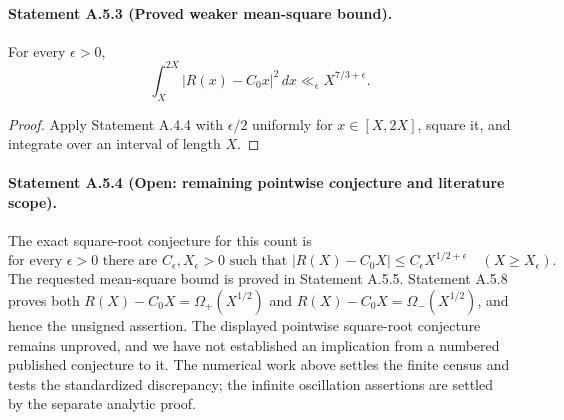 \paragraph{Statement A.5.3 (Proved weaker mean-square bound).}
For every $\epsilon>0$,
\[
 \int_X^{2X}|R(x)-C_0x|^2\,dx\ll_\epsilon X^{7/3+\epsilon}.
\]
\begin{proof}
Apply Statement A.4.4 with $\epsilon/2$ uniformly for
$x\in[X,2X]$, square it, and integrate over an interval of length $X$.
\end{proof}

\paragraph{Statement A.5.4 (Open: remaining pointwise conjecture and literature scope).}
The exact square-root conjecture for this count is
\[
 \text{for every }\epsilon>0\text{ there are }C_\epsilon,X_\epsilon>0
 \text{ such that }|R(X)-C_0X|\leq C_\epsilon X^{1/2+\epsilon}
 \quad(X\geq X_\epsilon).
\]
The requested mean-square bound is proved in Statement A.5.5.
Statement A.5.8 proves both
$R(X)-C_0X=\Omega_+(X^{1/2})$ and
$R(X)-C_0X=\Omega_-(X^{1/2})$, and hence the unsigned assertion.
The displayed pointwise square-root conjecture remains unproved,
and we have not established an implication from a numbered
published conjecture to it.
The numerical work above settles the finite census and tests the
standardized discrepancy; the infinite oscillation assertions
are settled by the separate analytic proof.

